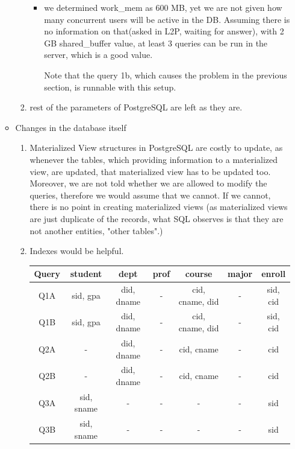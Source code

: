 \documentclass[10pt]{article}
\begin{document}
\begin{enumerate}
\begin{itemize}
\begin{enumerate}[1.]
\begin{itemize}[*]
							\item we determined work\_mem as 600 MB, yet we are not given how many concurrent users will be active in the DB. Assuming there is no information on that(asked in L2P, waiting for answer), with 2 GB shared\_buffer value, at least 3 queries can be run in the server, which is a good value.
							
							Note that the query 1b, which causes the problem in the previous section, is runnable with this setup.
							
							
						\end{itemize}
						
					\bigskip
						
					\item rest of the parameters of PostgreSQL are left as they are.
					
					\clearpage
					
				\end{enumerate}
			
			\item Changes in the database itself
			
				\begin{enumerate}[1.]
					\item Materialized View structures in PostgreSQL are costly to update, as whenever the tables, which providing information to a materialized view, are updated, that materialized view has to be updated too. Moreover, we are not told whether we are allowed to modify the queries, therefore  we would assume that we cannot. If we cannot, there is no point in creating materialized views (as materialized views are just duplicate of the records, what SQL observes is that they are not another entities, "other tables".)
					\bigskip
					
					\item Indexes would be helpful.
					
					\begin{table}[H]
						\centering
						\begin{tabular}{|c | c | c | c | c | c | c|}
							\hline
							Query & student & dept & prof & course & major & enroll \\
							\hline
							Q1A & sid, gpa & did, dname & - & cid, cname, did & - & sid, cid\\
							Q1B & sid, gpa & did, dname & - & cid, cname, did & - & sid, cid\\
							\hline
							Q2A & - & did, dname & - & cid, cname & - & cid \\
							Q2B & - & did, dname & - & cid, cname & - & cid \\
							\hline
							Q3A & sid, sname & - & - & - & - & sid\\
							Q3B & sid, sname & - & - & - & - & sid\\
							\hline
						\end{tabular}
					\end{table}
					

\end{enumerate}
\end{itemize}
\end{enumerate}
\end{document}

